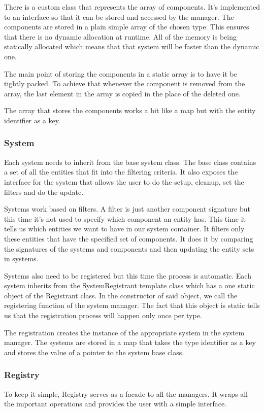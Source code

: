 \documentclass[12pt, english]{article}
\begin{document}
There is a custom class that represents the array of components. It's
implemented to an interface so that it can be stored and accessed by the
manager. The components are stored in a plain simple array of the chosen type.
This ensures that there is no dynamic allocation at runtime. All of the memory
is being statically allocated which means that that system will be faster than
the dynamic one.

The main point of storing the components in a static array is to have it be
tightly packed. To achieve that whenever the component is removed from the
array, the last element in the array is copied in the place of the deleted one.

The array that stores the components works a bit like a map but with the entity
identifier as a key.

\subsubsection{System}

Each system needs to inherit from the base system class. The base class
contains a set of all the entities that fit into the filtering criteria. It
also exposes the interface for the system that allows the user to do the setup,
cleanup, set the filters and do the update.

Systems work based on filters. A filter is just another component signature but
this time it's not used to specify which component an entity has. This time it
tells us which entities we want to have in our system container. It filters
only these entities that have the specified set of components. It does it by
comparing the signatures of the systems and components and then updating the
entity sets in systems.

Systems also need to be registered but this time the process is automatic. Each
system inherits from the SystemRegistrant template class which has a one static
object of the Registrant class. In the constructor of said object, we call the
registering function of the system manager. The fact that this object is static
tells us that the registration process will happen only once per type.

The registration creates the instance of the appropriate system in the system
manager. The systems are stored in a map that takes the type identifier as a
key and stores the value of a pointer to the system base class.

\subsubsection{Registry}
To keep it simple, Registry serves as a facade to all the managers. It wraps
all the important operations and provides the user with a simple interface.
\end{document}
